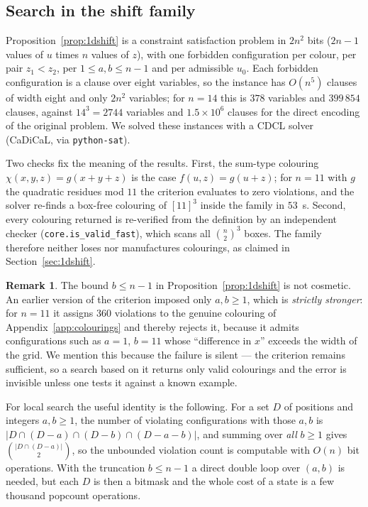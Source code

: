 \documentclass[11pt]{article}
\theoremstyle{definition}
\newtheorem{remark}[theorem]{Remark}
\begin{document}
\subsection{Search in the shift family}\label{sec:1dsearch}

Proposition~\ref{prop:1dshift} is a constraint satisfaction problem in $2n^2$ bits
($2n-1$ values of $u$ times $n$ values of $z$), with one forbidden configuration per
colour, per pair $z_1<z_2$, per $1\le a,b\le n-1$ and per admissible $u_0$. Each
forbidden configuration is a clause over eight variables, so the instance has $O(n^5)$
clauses of width eight and only $2n^2$ variables; for $n=14$ this is $378$ variables and
$399\,854$ clauses, against $14^3=2744$ variables and $1.5\times10^6$ clauses for the
direct encoding of the original problem. We solved these instances with a CDCL solver
(CaDiCaL, via \texttt{python-sat}).

Two checks fix the meaning of the results. First, the sum-type colouring
$\chi(x,y,z)=g(x+y+z)$ is the case $f(u,z)=g(u+z)$; for $n=11$ with $g$ the quadratic
residues mod $11$ the criterion evaluates to zero violations, and the solver re-finds a
box-free colouring of $[11]^3$ inside the family in $53$~s. Second, every colouring
returned is re-verified from the definition by an independent checker
(\texttt{core.is\_valid\_fast}), which scans all $\binom{n}{2}^3$ boxes. The family
therefore neither loses nor manufactures colourings, as claimed in
Section~\ref{sec:1dshift}.

\begin{remark}
The bound $b\le n-1$ in Proposition~\ref{prop:1dshift} is not cosmetic. An earlier
version of the criterion imposed only $a,b\ge1$, which is \emph{strictly stronger}: for
$n=11$ it assigns $360$ violations to the genuine colouring of
Appendix~\ref{app:colourings} and thereby rejects it, because it admits configurations
such as $a=1$, $b=11$ whose ``difference in $x$'' exceeds the width of the grid. We
mention this because the failure is silent --- the criterion remains sufficient, so a
search based on it returns only valid colourings and the error is invisible unless one
tests it against a known example.
\end{remark}

For local search the useful identity is the following. For a set $D$ of positions and
integers $a,b\ge1$, the number of violating configurations with those $a,b$ is
$|D\cap(D-a)\cap(D-b)\cap(D-a-b)|$, and summing over \emph{all} $b\ge1$ gives
$\binom{|D\cap(D-a)|}{2}$, so the unbounded violation count is computable with $O(n)$
bit operations. With the truncation $b\le n-1$ a direct double loop over $(a,b)$ is
needed, but each $D$ is then a bitmask and the whole cost of a state is a few thousand
popcount operations.
\end{document}
